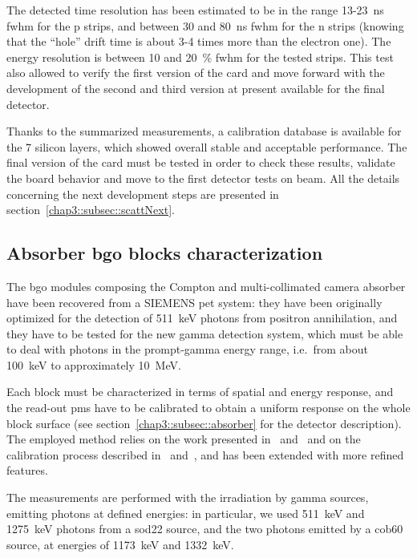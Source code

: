 The detected time resolution has been estimated to be in the range 13-23~ns \gls{fwhm} for the p strips, and between 30 and 80~ns \gls{fwhm} for the n strips (knowing that the \enquote{hole} drift time is about 3-4 times more than the electron one). The energy resolution is between 10 and 20~\% \gls{fwhm} for the tested strips. This test also allowed to verify the first version of the card and move forward with the development of the second and third version at present available for the final detector.

Thanks to the summarized measurements, a calibration database is available for the 7 silicon layers, which showed overall stable and acceptable performance. The final version of the card must be tested in order to check these results, validate the board behavior and move to the first detector tests on beam. All the details concerning the next development steps are presented in section~\ref{chap3::subsec::scattNext}.    


\subsection{Absorber \gls{bgo} blocks characterization}\label{chap3::subsec::absBGOchar}

The \gls{bgo} modules composing the Compton and multi-collimated camera absorber have been recovered from a SIEMENS \gls{pet} system: they have been originally optimized for the detection of 511~keV photons from positron annihilation, and they have to be tested for the new gamma detection system, which must be able to deal with photons in the prompt-gamma energy range, i.e.~from about 100~keV to approximately 10~MeV.
 
Each block must be characterized in terms of spatial and energy response, and the read-out \glspl{pm} have to be calibrated to obtain a uniform response on the whole block surface (see section~\ref{chap3::subsec::absorber} for the detector description). The employed method relies on the work presented in~\cite{Rogers1994} and~\cite{Tornai1994} and on the calibration process described in~\cite{Golnik2015} and~\cite{HuesoGonzalez2015}, and has been extended with more refined features.

The measurements are performed with the irradiation by gamma sources, emitting photons at defined energies: in particular, we used 511~keV and 1275~keV photons from a \gls{sod22} source, and the two photons emitted by a \gls{cob60} source, at energies of 1173~keV and 1332~keV.

